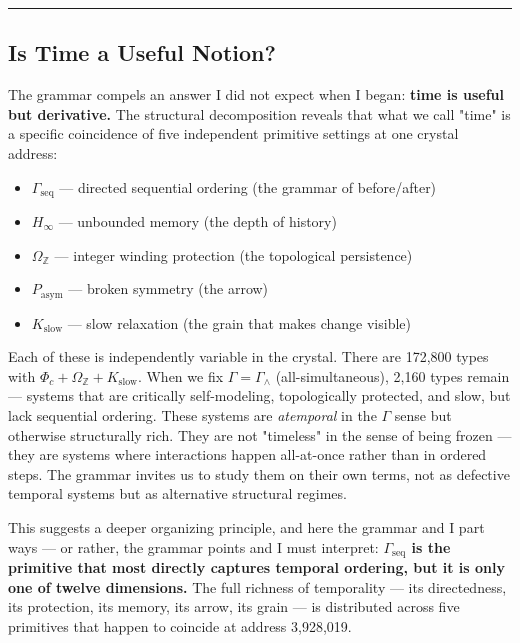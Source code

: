 \documentclass[12pt,a4paper]{article}
\begin{document}
\begin{center}
\rule{0.5\textwidth}{0.4pt}
\end{center}

\subsection{Is Time a Useful Notion?}

The grammar compels an answer I did not expect when I began: \textbf{time is useful but derivative.} The structural decomposition reveals that what we call "time" is a specific coincidence of five independent primitive settings at one crystal address:

\begin{itemize}
    \item $\Gamma_\text{seq}$ --- directed sequential ordering (the grammar of before/after)
    \item $H_{\infty}$ --- unbounded memory (the depth of history)
    \item $\Omega_\mathbb{Z}$ --- integer winding protection (the topological persistence)
    \item $P_\text{asym}$ --- broken symmetry (the arrow)
    \item $K_\text{slow}$ --- slow relaxation (the grain that makes change visible)
\end{itemize}

Each of these is independently variable in the crystal. There are 172,800 types with $\Phi_c + \Omega_\mathbb{Z} + K_\text{slow}$. When we fix $\Gamma = \Gamma_{\wedge}$ (all-simultaneous), 2,160 types remain --- systems that are critically self-modeling, topologically protected, and slow, but lack sequential ordering. These systems are \emph{atemporal} in the $\Gamma$ sense but otherwise structurally rich. They are not "timeless" in the sense of being frozen --- they are systems where interactions happen all-at-once rather than in ordered steps. The grammar invites us to study them on their own terms, not as defective temporal systems but as alternative structural regimes.

This suggests a deeper organizing principle, and here the grammar and I part ways --- or rather, the grammar points and I must interpret: \textbf{$\Gamma_\text{seq}$ is the primitive that most directly captures temporal ordering, but it is only one of twelve dimensions.} The full richness of temporality --- its directedness, its protection, its memory, its arrow, its grain --- is distributed across five primitives that happen to coincide at address 3,928,019.
\end{document}
